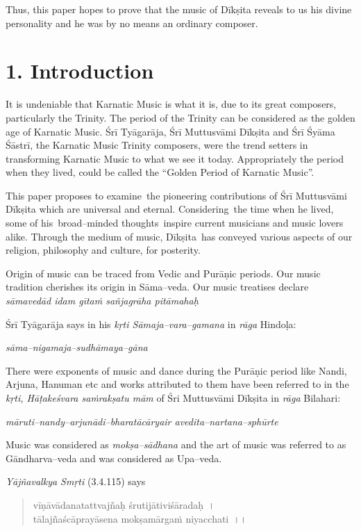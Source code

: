 Thus, this paper hopes to prove that the music of Dīkṣita reveals to us his divine personality and he was by no means an ordinary composer.


\section*{1. Introduction}

It is undeniable that Karnatic Music is what it is, due to its great composers, particularly the Trinity. The period of the Trinity can be considered as the golden age of Karnatic Music. Śrī Tyāgarāja, Śrī Muttusvāmi Dīkṣita and Śrī Śyāma Śāstrī, the Karnatic Music Trinity composers, were the trend setters in transforming Karnatic Music to what we see it today. Appropriately the period when they lived, could be called the “Golden Period of Karnatic Music”. 

This paper proposes to examine the pioneering contributions of Śrī Muttusvāmi Dīkṣita which are universal and eternal. Considering the time when he lived, some of his broad–minded thoughts inspire current musicians and music lovers alike. Through the medium of music, Dīkṣita has conveyed various aspects of our religion, philosophy and culture, for posterity. 

Origin of music can be traced from Vedic and Purāṇic periods. Our music tradition cherishes its origin in Sāma–veda. Our music treatises declare \textit{sāmavedād idam gītaṁ sañjagrāha pitāmahaḥ}

Śrī Tyāgarāja says in his \textit{kṛti Sāmaja–vara–gamana} in \textit{rāga} Hindoḷa:

\textit{sāma–nigamaja–sudhāmaya–gāna}

There were exponents of music and dance during the Purāṇic period like Nandi, Arjuna, Hanuman etc and works attributed to them have been referred to in the \textit{kṛti, Hāṭakeśvara saṁrakṣatu mām} of Śri Muttusvāmi Dīkṣita in \textit{rāga} Bilahari:

\textit{māruti–nandy–arjunādi–bharatācāryair avedita–nartana–sphūrte}

Music was considered as \textit{mokṣa–sādhana} and the art of music was referred to as Gāndharva–veda and was considered as Upa–veda.

\textit{Yājñavalkya Smṛti} (3.4.115) says

\begin{verse}
vīṇāvādanatattvajñaḥ śrutijātiviśāradaḥ~।\\ tālajñaścāprayāsena mokṣamārgaṁ niyacchati~।।
\end{verse}

